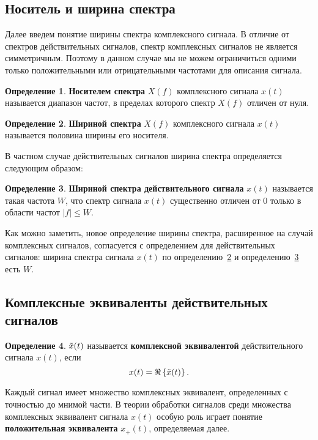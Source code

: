 \documentclass{book}
\numberwithin{theorem}{chapter}
\numberwithin{statement}{chapter}
\numberwithin{lemma}{chapter}
\theoremstyle{definition}
\numberwithin{task}{chapter}
\theoremstyle{remark}
\numberwithin{example}{chapter}
\theoremstyle{definition}
\newtheorem{definition}{Определение}
\numberwithin{definition}{chapter}
\theoremstyle{remark}
\theoremstyle{remark}
\numberwithin{lyrics}{section}
\begin{document}
\subsection{Носитель и ширина спектра}
Далее введем понятие ширины спектра комплексного сигнала. В отличие от спектров действительных сигналов, спектр комплексных сигналов не является симметричным. Поэтому в данном случае мы не можем ограничиться одними только положительными или отрицательными частотами для описания сигнала.
\begin{definition}
\textbf{Носителем спектра} $X(f)$ комплексного сигнала $x(t)$ называется диапазон частот, в пределах которого спектр $X(f)$ отличен от нуля.
\end{definition}
\begin{definition}
\label{def:comp_spectrum_width}
\textbf{Шириной спектра} $X(f)$ комплексного сигнала $x(t)$ называется половина ширины его носителя. 
\end{definition}
В частном случае действительных сигналов ширина спектра определяется следующим образом:
\begin{definition}
\label{def:real_spectrum_width}
\textbf{Шириной спектра действительного сигнала} $x(t)$ называется такая частота $W$, что спектр сигнала $x(t)$ существенно отличен от 0 только в области частот $|f| \le W$.
\end{definition}
Как можно заметить, новое определение ширины спектра, расширенное на случай комплексных сигналов, согласуется с определением для действительных сигналов: ширина спектра сигнала $x(t)$ по определению~\ref{def:comp_spectrum_width} и определению~\ref{def:real_spectrum_width} есть $W$.

\subsection{Комплексные эквиваленты действительных сигналов}
\begin{definition}
$\tilde{x}(t)$ называется \textbf{комплексной эквивалентой} действительного сигнала $x(t)$, если 
\begin{equation}
x(t) = \Re\left\{\tilde{x}(t)\right\}.
\end{equation}
\end{definition}
Каждый сигнал имеет множество комплексных эквивалент, определенных с точностью до мнимой части. В теории обработки сигналов среди множества комплексных эквивалент сигнала $x(t)$ особую роль играет понятие \textbf{положительная эквивалента} $x_+(t)$, определяемая далее.
\end{document}
